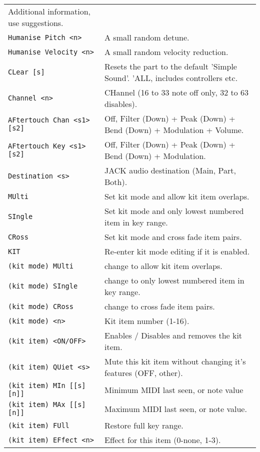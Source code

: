 \begin{center}
\begin{longtable}[l]{ ll}
   Additional information, use suggestions. \\
\texttt{Humanise Pitch <n>} &
   A small random detune. \\
\texttt{Humanise Velocity <n>} &
   A small random velocity reduction. \\
\texttt{CLear [s]} &
  Resets the part to the default 'Simple Sound'. 'ALL, includes controllers
  etc. \\
\texttt{Channel <n>} &
   CHannel (16 to 33 note off only, 32 to 63 disables).   \\
\texttt{AFtertouch Chan <s1> [s2]} &
   Off, Filter (Down) + Peak (Down) + Bend (Down) + Modulation + Volume. \\
\texttt{AFtertouch Key <s1> [s2]} &
   Off, Filter (Down) + Peak (Down) + Bend (Down) + Modulation. \\
\texttt{Destination <s>} &
   JACK audio destination (Main, Part, Both).  \\
\texttt{MUlti} &
   Set kit mode and allow kit item overlaps. \\
\texttt{SIngle} &
   Set kit mode and only lowest numbered item in key range. \\
\texttt{CRoss} &
   Set kit mode and cross fade item pairs. \\
\texttt{KIT} &
   Re-enter kit mode editing if it is enabled. \\
   \texttt{(kit mode) MUlti} &
      change to allow kit item overlaps. \\
   \texttt{(kit mode) SIngle} &
      change to only lowest numbered item in key range. \\
   \texttt{(kit mode) CRoss} &
      change to cross fade item pairs. \\
   \texttt{(kit mode) <n>} &
      Kit item number (1-16). \\
   \texttt{(kit item) <ON/OFF>} &
      Enables / Disables and removes the kit item. \\
   \texttt{(kit item) QUiet <s>} &
      Mute this kit item without changing it's features (OFF, {other}). \\
   \texttt{(kit item) MIn [[s][n]]} &
      Minimum MIDI last seen, or note value   \\
   \texttt{(kit item) MAx [[s][n]]} &
      Maximum MIDI last seen, or note value.   \\
   \texttt{(kit item) FUll} &
      Restore full key range.   \\
   \texttt{(kit item) EFfect <n>} &
      Effect for this item (0-none, 1-3). \\

\end{longtable}
\end{center}
